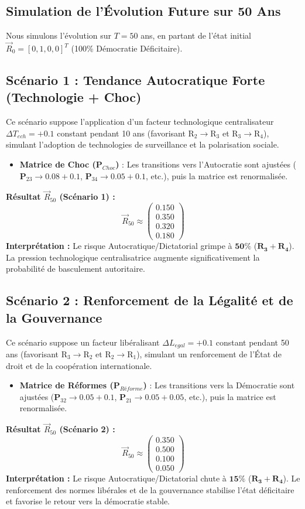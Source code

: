 \documentclass[a4paper,12pt]{report}
\begin{document}
	\subsection*{Simulation de l'Évolution Future sur 50 Ans}
	Nous simulons l'évolution sur $T=50$ ans, en partant de l'état initial $\vec{R}_0 = [0, 1, 0, 0]^T$ (100\% Démocratie Déficitaire).
	
	\subsection*{Scénario 1 : Tendance Autocratique Forte (Technologie + Choc)}
	Ce scénario suppose l'application d'un facteur technologique centralisateur $\Delta T_{ech} = +0.1$ constant pendant 10 ans (favorisant $\text{R}_2 \to \text{R}_3$ et $\text{R}_3 \to \text{R}_4$), simulant l'adoption de technologies de surveillance et la polarisation sociale.
	\begin{itemize}
		\item \textbf{Matrice de Choc ($\mathbf{P}_{Choc}$)} : Les transitions vers l'Autocratie sont ajustées ($\mathbf{P}_{23} \to 0.08 + 0.1$, $\mathbf{P}_{34} \to 0.05 + 0.1$, etc.), puis la matrice est renormalisée.
	\end{itemize}
	\textbf{Résultat $\vec{R}_{50}$ (Scénario 1) :}
	$$
	\vec{R}_{50} \approx \begin{pmatrix}
		0.150 \\
		0.350 \\
		0.320 \\
		0.180
	\end{pmatrix}
	$$
	\textbf{Interprétation :} Le risque Autocratique/Dictatorial grimpe à $\mathbf{50\%}$ ($\mathbf{R_3+R_4}$). La pression technologique centralisatrice augmente significativement la probabilité de basculement autoritaire.
	
	\subsection*{Scénario 2 : Renforcement de la Légalité et de la Gouvernance}
	Ce scénario suppose un facteur libéralisant $\Delta L_{egal} = +0.1$ constant pendant 50 ans (favorisant $\text{R}_3 \to \text{R}_2$ et $\text{R}_2 \to \text{R}_1$), simulant un renforcement de l'État de droit et de la coopération internationale.
	\begin{itemize}
		\item \textbf{Matrice de Réformes ($\mathbf{P}_{Réforme}$)} : Les transitions vers la Démocratie sont ajustées ($\mathbf{P}_{32} \to 0.05 + 0.1$, $\mathbf{P}_{21} \to 0.05 + 0.05$, etc.), puis la matrice est renormalisée.
	\end{itemize}
	\textbf{Résultat $\vec{R}_{50}$ (Scénario 2) :}
	$$
	\vec{R}_{50} \approx \begin{pmatrix}
		0.350 \\
		0.500 \\
		0.100 \\
		0.050
	\end{pmatrix}
	$$
	\textbf{Interprétation :} Le risque Autocratique/Dictatorial chute à $\mathbf{15\%}$ ($\mathbf{R_3+R_4}$). Le renforcement des normes libérales et de la gouvernance stabilise l'état déficitaire et favorise le retour vers la démocratie stable.
	
\end{document}
